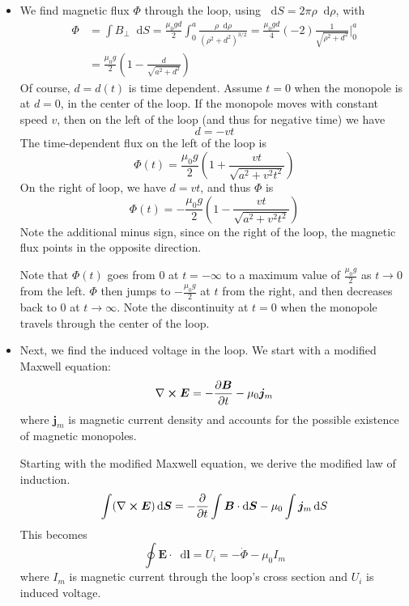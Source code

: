 \documentclass[11pt, a4paper]{article}
\newcommand{\diff}{\mathop{}\!\mathrm{d}} %
\renewcommand{\vec}[1]{\bm{#1}} %
\newcommand{\E}{\vec{E}}  %
\newcommand{\B}{\vec{B}}  %
\newcommand{\mm}{\mu_{0}}  %
\newcommand{\m}{\vec{m}}  %
\renewcommand{\curl}{\nabla \cross}
\begin{document}
\begin{itemize}
	\item We find magnetic flux $ \Phi $ through the loop, using $  \diff S = 2\pi \rho \diff \rho $, with
	\begin{align*}
		\Phi &= \int B_{\perp} \diff S = \frac{\mm g d}{2} \int_{0}^{a} \frac{\rho \diff \rho}{(\rho^{2} + d^{2})^{3/2}} = \frac{\mm g d}{4}(-2)\frac{1}{\sqrt{\rho^{2} + d^{2}}}\bigg |_{0}^{a}\\
		& = \frac{\mm g}{2}\left(1 - \frac{d}{\sqrt{a^{2} + d^{2}}}\right)
	\end{align*}
	Of course, $ d = d(t) $ is time dependent. Assume $ t = 0 $ when the monopole is at $ d = 0 $, in the center of the loop. If the monopole moves with constant speed $ v $, then on the left of the loop (and thus for negative time) we have
	\begin{equation*}
		d = - vt
	\end{equation*}
	The time-dependent flux on the left of the loop is
	\begin{equation*}
		\Phi(t) = \frac{\mm g}{2}\left(1 + \frac{vt}{\sqrt{a^{2} +v^{2}t^{2}}}\right)
	\end{equation*}
	On the right of loop, we have $ d = vt $, and thus $ \Phi $ is
	\begin{equation*}
		\Phi(t) = -\frac{\mm g}{2}\left(1 - \frac{vt}{\sqrt{a^{2} +v^{2}t^{2}}}\right)
	\end{equation*}
	Note the additional minus sign, since on the right of the loop, the magnetic flux points in the opposite direction.
	
	Note that $ \Phi(t) $ goes from $ 0 $ at $ t = -\infty $ to a maximum value of $ \frac{\mm g}{2} $ as $ t \to 0 $ from the left. $ \Phi $ then jumps to $ - \frac{\mm g}{2}  $ at $ t  $ from the right, and then decreases back to 0 at $ t \to \infty $. Note the discontinuity at $ t = 0 $ when the monopole travels through the center of the loop.
	
	\item Next, we find the induced voltage in the loop. We start with a modified Maxwell equation:
	\begin{equation*}
		\curl \E = - \pdv{\B}{t} - \mm \vec{j}_{m}
	\end{equation*}
	where $ \vec{j}_{m} $ is magnetic current density and accounts for the possible existence of magnetic monopoles. 
	
	Starting with the modified Maxwell equation, we derive the modified law of induction. 
	\begin{equation*}
		\int (\curl \E)\diff \vec{S} = - \pdv{t}\int \B \cdot \diff \vec{S} - \mm \int \vec{j}_{m}\diff S 
	\end{equation*}
	This becomes
	\begin{equation*}
		\oint \E \cdot \diff \vec{l} = U_{i} = - \dot{\Phi} - \mm I_{m}
	\end{equation*}
	where $ I_{m} $ is magnetic current through the loop's cross section and $ U_{i} $ is induced voltage. 
	

\end{itemize}
\end{document}
